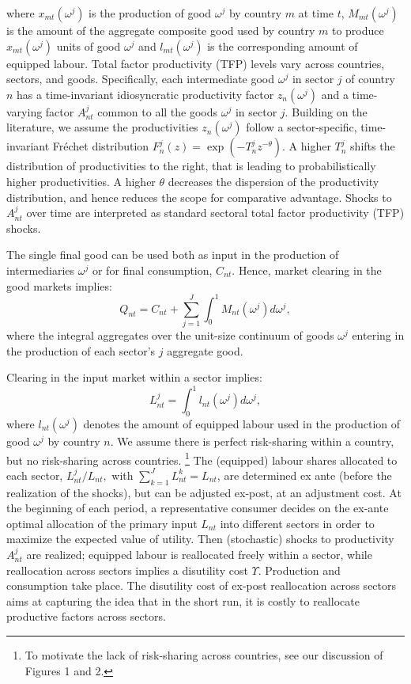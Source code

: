 \documentclass{article}
\begin{document}
where $x_{mt}(\omega ^{j})$ is the production of good $\omega ^{j}$ by
country $m$ at time $t$, $M_{mt}(\omega ^{j})$ is the amount of the
aggregate composite good used by country $m$ to produce $x_{mt}(\omega ^{j})$
units of good $\omega ^{j}$ and $l_{mt}(\omega ^{j})$ is the corresponding
amount of equipped labour. Total factor productivity (TFP) levels vary
across countries, sectors, and goods. Specifically, each intermediate good $%
\omega ^{j}$ in sector $j$ of country $n$ has a time-invariant idiosyncratic
productivity factor $z_{n}(\omega ^{j})$ and a time-varying factor $%
A_{nt}^{j}$ common to all the goods $\omega ^{j}$ in sector $j$. Building on
the literature, we assume the productivities $z_{n}(\omega ^{j})$ follow a
sector-specific, time-invariant Fr\'{e}chet distribution $F_{n}^{j}(z)=\exp
(-T_{n}^{j}z^{-\theta })$. A higher $T_{n}^{j}$ shifts the distribution of
productivities to the right, that is leading to probabilistically higher
productivities. A higher $\theta $ decreases the dispersion of the
productivity distribution, and hence reduces the scope for comparative
advantage. Shocks to $A_{nt}^{j}$ over time are interpreted as standard
sectoral total factor productivity (TFP) shocks.

The single final good can be used both as input in the production of
intermediaries $\omega^{j}$ or for final consumption, $C_{nt}$. Hence,
market clearing in the good markets implies: 
\begin{equation*}
Q_{nt} = C_{nt} + \sum_{j=1}^{J}\int_{0}^{1}M_{nt}(\omega^{j})d\omega ^{j}, 
\end{equation*}
where the integral aggregates over the unit-size continuum of goods $%
\omega^{j}$ entering in the production of each sector's $j$ aggregate good.

Clearing in the input market within a sector implies: 
\begin{equation*}
L_{nt}^{j}=\int_{0}^{1}l_{nt}(\omega ^{j})d\omega ^{j}, 
\end{equation*}%
where $l_{nt}(\omega ^{j})$ denotes the amount of equipped labour used in
the production of good $\omega ^{j}$ by country $n$. We assume there is
perfect risk-sharing within a country, but no risk-sharing across countries.%
\footnote{%
To motivate the lack of risk-sharing across countries, see our discussion of
Figures 1 and 2.} The (equipped) labour shares allocated to each sector, $%
L_{nt}^{j}/L_{nt},$ with $\sum\nolimits_{k=1}^{J}L_{nt}^{k}=L_{nt}$, are
determined ex ante (before the realization of the shocks), but can be
adjusted ex-post, at an adjustment cost. At the beginning of each period, a
representative consumer decides on the ex-ante optimal allocation of the
primary input $L_{nt}$ into different sectors in order to maximize the
expected value of utility. Then (stochastic) shocks to productivity $%
A_{nt}^{j}$ are realized; equipped labour is reallocated freely within a
sector, while reallocation across sectors implies a disutility cost $%
\Upsilon .$ Production and consumption take place. The disutility cost of
ex-post reallocation across sectors aims at capturing the idea that in the
short run, it is costly to reallocate productive factors across sectors.
\end{document}
